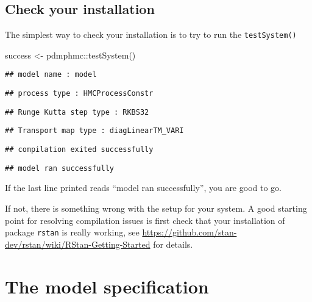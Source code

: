 \documentclass[
]{book}
\newenvironment{Shaded}{\begin{snugshade}}{\end{snugshade}}
\newcommand{\FunctionTok}[1]{\textcolor[rgb]{0.00,0.00,0.00}{#1}}
\newcommand{\NormalTok}[1]{#1}
\newcommand{\OtherTok}[1]{\textcolor[rgb]{0.56,0.35,0.01}{#1}}
\newcommand{\SpecialCharTok}[1]{\textcolor[rgb]{0.00,0.00,0.00}{#1}}
\begin{document}
\hypertarget{check-your-installation}{%
\section{Check your installation}\label{check-your-installation}}

The simplest way to check your installation is to try to run the \texttt{testSystem()}

\begin{Shaded}
\begin{Highlighting}[]
\NormalTok{success }\OtherTok{\textless{}{-}}\NormalTok{ pdmphmc}\SpecialCharTok{::}\FunctionTok{testSystem}\NormalTok{()}
\end{Highlighting}
\end{Shaded}

\begin{verbatim}
## model name : model
\end{verbatim}

\begin{verbatim}
## process type : HMCProcessConstr
\end{verbatim}

\begin{verbatim}
## Runge Kutta step type : RKBS32
\end{verbatim}

\begin{verbatim}
## Transport map type : diagLinearTM_VARI
\end{verbatim}

\begin{verbatim}
## compilation exited successfully
\end{verbatim}

\begin{verbatim}
## model ran successfully
\end{verbatim}

If the last line printed reads ``model ran successfully'', you are good to go.

If not, there is something wrong with the setup for your system. A good starting point for resolving compilation issues is first check that your installation of package \texttt{rstan} is really working, see \url{https://github.com/stan-dev/rstan/wiki/RStan-Getting-Started} for details.

\hypertarget{the-model-specification}{%
\chapter{The model specification}\label{the-model-specification}}
\end{document}
